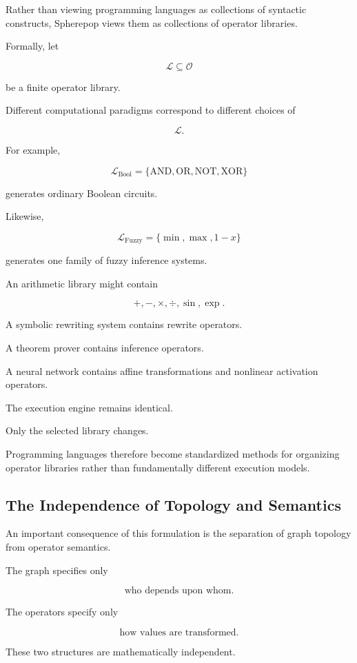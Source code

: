 \documentclass[12pt,oneside]{article}
\begin{document}
Rather than viewing programming languages as collections of syntactic constructs, Spherepop views them as collections of operator libraries.

Formally, let

\[
\mathcal{L}
\subseteq
\mathcal O
\]

be a finite operator library.

Different computational paradigms correspond to different choices of

\[
\mathcal L.
\]

For example,

\[
\mathcal L_{\mathrm{Bool}}
=
\{
\mathrm{AND},
\mathrm{OR},
\mathrm{NOT},
\mathrm{XOR}
\}
\]

generates ordinary Boolean circuits.

Likewise,

\[
\mathcal L_{\mathrm{Fuzzy}}
=
\{
\min,
\max,
1-x
\}
\]

generates one family of fuzzy inference systems.

An arithmetic library might contain

\[
+,
-,
\times,
\div,
\sin,
\exp.
\]

A symbolic rewriting system contains rewrite operators.

A theorem prover contains inference operators.

A neural network contains affine transformations and nonlinear activation operators.

The execution engine remains identical.

Only the selected library changes.

Programming languages therefore become standardized methods for organizing operator libraries rather than fundamentally different execution models.

\subsection{The Independence of Topology and Semantics}

An important consequence of this formulation is the separation of graph topology from operator semantics.

The graph specifies only

\[
\text{who depends upon whom}.
\]

The operators specify only

\[
\text{how values are transformed}.
\]

These two structures are mathematically independent.
\end{document}
